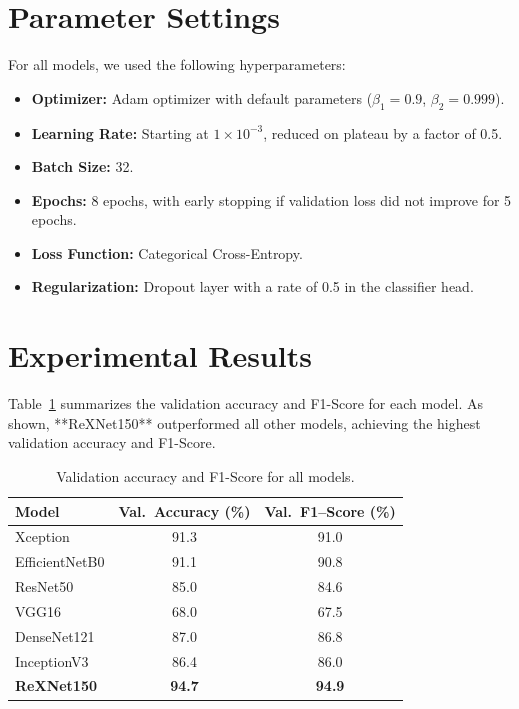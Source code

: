 \section{Parameter Settings}
For all models, we used the following hyperparameters:
\begin{itemize}
  \item \textbf{Optimizer:} Adam optimizer with default parameters ($\beta_1=0.9$, $\beta_2=0.999$).
  \item \textbf{Learning Rate:} Starting at $1 \times 10^{-3}$, reduced on plateau by a factor of 0.5.
  \item \textbf{Batch Size:} 32.
  \item \textbf{Epochs:} 8 epochs, with early stopping if validation loss did not improve for 5 epochs.
  \item \textbf{Loss Function:} Categorical Cross-Entropy.
  \item \textbf{Regularization:} Dropout layer with a rate of 0.5 in the classifier head.
\end{itemize}

\section{Experimental Results}
Table~\ref{tab:results} summarizes the validation accuracy and F1-Score for each model. As shown, **ReXNet150** outperformed all other models, achieving the highest validation accuracy and F1-Score.

\begin{table}[H]
  \centering
  \begin{tabular}{lcc}
    \toprule
    \textbf{Model}       & \textbf{Val.\ Accuracy (\%)} & \textbf{Val.\ F1–Score (\%)} \\
    \midrule
    Xception             & 91.3                         & 91.0                          \\
    EfficientNetB0       & 91.1                         & 90.8                          \\
    ResNet50             & 85.0                         & 84.6                          \\
    VGG16                & 68.0                         & 67.5                          \\
    DenseNet121          & 87.0                         & 86.8                          \\
    InceptionV3          & 86.4                         & 86.0                          \\
    \textbf{ReXNet150}   & \textbf{94.7}                & \textbf{94.9}                 \\
    \bottomrule
  \end{tabular}
  \caption{Validation accuracy and F1-Score for all models.}
  \label{tab:results}
\end{table}

